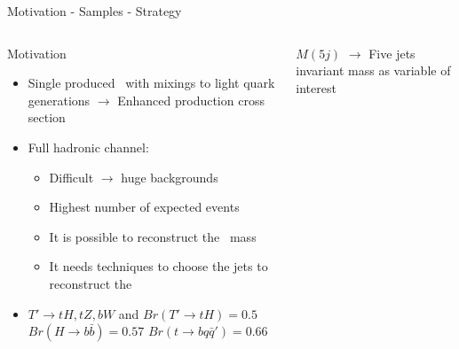 \begin{frame}{Motivation - Samples - Strategy}
\vspace{-.5cm}

\begin{columns}
\begin{column}{.50\textwidth}
\begin{block}{Motivation}
\begin{itemize}\tiny
\item Single produced \Tp~with mixings to light quark generations $\to$ Enhanced production cross section
\item Full hadronic channel:
  \begin{itemize}\tiny
  \item Difficult $\to$ huge backgrounds
  \item Highest number of expected events
  \item It is possible to reconstruct the \Tp~mass
  \item It needs techniques to choose the jets to reconstruct the \Tp
  \end{itemize}
\item $T'\to tH, tZ, bW$ and $Br(T'\to tH)=0.5$ $Br(H\to b\bar{b})=0.57$ $Br(t\to bq\bar{q}')=0.66$
\end{itemize}
\end{block}
\end{column}

\begin{column}{.50\textwidth}
\begin{center}
\end{center}
\vspace{-.5cm}
\begin{block}{}
\tiny $M(5j)$ $\to$ Five jets invariant mass as variable of interest
\end{block}
\end{column}
\end{columns}


\end{frame}
